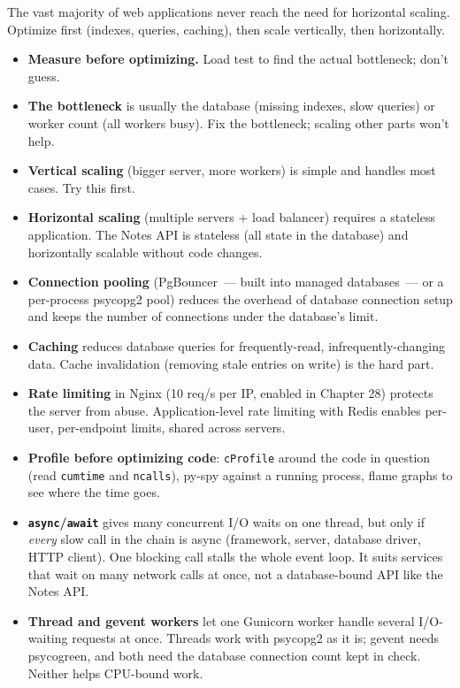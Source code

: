 \noindent{}The vast majority of web applications never reach the need for horizontal scaling. Optimize first (indexes, queries, caching), then scale vertically, then horizontally.

\label{36-scaling-load:key-takeaways}
\begin{takeaways}

\begin{itemize}
\tightlist
\item
  \textbf{Measure before optimizing.} Load test to find the actual bottleneck; don't guess.
\item
  \textbf{The bottleneck} is usually the database (missing indexes, slow queries) or worker count (all workers busy). Fix the bottleneck; scaling other parts won't help.
\item
  \textbf{Vertical scaling} (bigger server, more workers) is simple and handles most cases. Try this first.
\item
  \textbf{Horizontal scaling} (multiple servers + load balancer) requires a stateless application. The Notes API is stateless (all state in the database) and horizontally scalable without code changes.
\item
  \textbf{Connection pooling} (PgBouncer~--- built into managed databases~--- or a per-process psycopg2 pool) reduces the overhead of database connection setup and keeps the number of connections under the database's limit.
\item
  \textbf{Caching} reduces database queries for frequently-read, infrequently-changing data. Cache invalidation (removing stale entries on write) is the hard part.
\item
  \textbf{Rate limiting} in Nginx (10 req/s per IP, enabled in Chapter 28) protects the server from abuse. Application-level rate limiting with Redis enables per-user, per-endpoint limits, shared across servers.
\item
  \textbf{Profile before optimizing code}: \texttt{cProfile} around the code in question (read \texttt{cumtime} and \texttt{ncalls}), py-spy against a running process, flame graphs to see where the time goes.
\item
  \textbf{\texttt{async}/\texttt{await}} gives many concurrent I/O waits on one thread, but only if \emph{every} slow call in the chain is async (framework, server, database driver, HTTP client). One blocking call stalls the whole event loop. It suits services that wait on many network calls at once, not a database-bound API like the Notes API.
\item
  \textbf{Thread and gevent workers} let one Gunicorn worker handle several I/O-waiting requests at once. Threads work with psycopg2 as it is; gevent needs psycogreen, and both need the database connection count kept in check. Neither helps CPU-bound work.
\end{itemize}

\end{takeaways}

